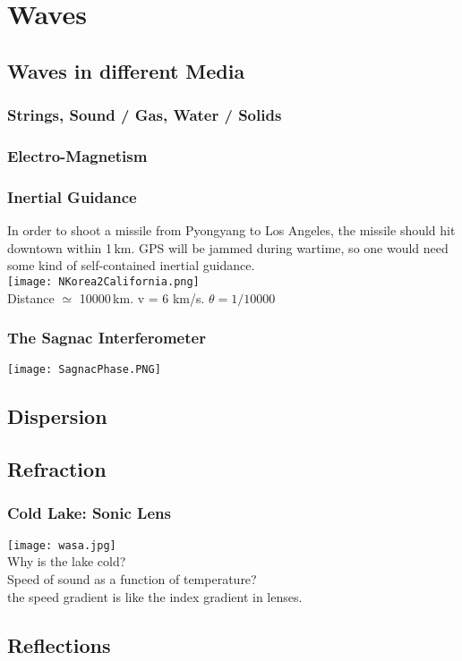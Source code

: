 \documentclass[pdf, handout, xcolor={usenames,dvipsnames,svgnames,table}, hideothersubsections]{beamer}
\begin{document}
\section{Waves}
   \subsection{Waves in different Media}
       \subsubsection{Strings, Sound / Gas, Water / Solids}
       \subsubsection{Electro-Magnetism}
\begin{frame}
\frametitle{Inertial Guidance}
In order to shoot a missile from Pyongyang to Los Angeles, the missile
should hit downtown within 1\,km. GPS will be jammed during wartime,
so one would need some kind of self-contained inertial guidance.\\
\texttt{[image: NKorea2California.png]} \\
Distance $\simeq$ 10000\,km. v = 6 km/s. $\theta = 1/10000$
\end{frame}
\begin{frame}
\frametitle{The Sagnac Interferometer}

\centering
\texttt{[image: SagnacPhase.PNG]}

\end{frame}
\subsection{Dispersion}
\subsection{Refraction}
\begin{frame}
\frametitle{Cold Lake: Sonic Lens}
\texttt{[image: wasa.jpg]} \\

Why is the lake cold? \\
Speed of sound as a function of temperature? \\
the speed gradient is like the index gradient in lenses.
\end{frame}
\subsection{Reflections}
\end{document}
